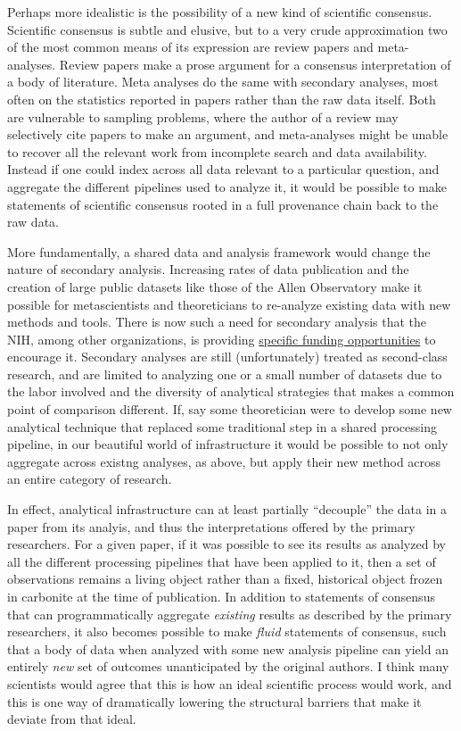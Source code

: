 \documentclass{article}
\begin{document}
Perhaps more idealistic is the possibility of a new kind of scientific
consensus. Scientific consensus is subtle and elusive, but to a very
crude approximation two of the most common means of its expression are
review papers and meta-analyses. Review papers make a prose argument for
a consensus interpretation of a body of literature. Meta analyses do the
same with secondary analyses, most often on the statistics reported in
papers rather than the raw data itself. Both are vulnerable to sampling
problems, where the author of a review may selectively cite papers to
make an argument, and meta-analyses might be unable to recover all the
relevant work from incomplete search and data availability. Instead if
one could index across all data relevant to a particular question, and
aggregate the different pipelines used to analyze it, it would be
possible to make statements of scientific consensus rooted in a full
provenance chain back to the raw data.

More fundamentally, a shared data and analysis framework would change
the nature of secondary analysis. Increasing rates of data publication
and the creation of large public datasets like those of the Allen
Observatory make it possible for metascientists and theoreticians to
re-analyze existing data with new methods and tools. There is now such a
need for secondary analysis that the NIH, among other organizations, is
providing
\href{https://grants.nih.gov/grants/guide/rfa-files/rfa-mh-20-120.html}{specific
funding opportunities} to encourage it. Secondary analyses are still
(unfortunately) treated as second-class research, and are limited to
analyzing one or a small number of datasets due to the labor involved
and the diversity of analytical strategies that makes a common point of
comparison different. If, say some theoretician were to develop some new
analytical technique that replaced some traditional step in a shared
processing pipeline, in our beautiful world of infrastructure it would
be possible to not only aggregate across existng analyses, as above, but
apply their new method across an entire category of research.

In effect, analytical infrastructure can at least partially ``decouple''
the data in a paper from its analyis, and thus the interpretations
offered by the primary researchers. For a given paper, if it was
possible to see its results as analyzed by all the different processing
pipelines that have been applied to it, then a set of observations
remains a living object rather than a fixed, historical object frozen in
carbonite at the time of publication. In addition to statements of
consensus that can programmatically aggregate \emph{existing} results as
described by the primary researchers, it also becomes possible to make
\emph{fluid} statements of consensus, such that a body of data when
analyzed with some new analysis pipeline can yield an entirely
\emph{new} set of outcomes unanticipated by the original authors. I
think many scientists would agree that this is how an ideal scientific
process would work, and this is one way of dramatically lowering the
structural barriers that make it deviate from that ideal.
\end{document}
